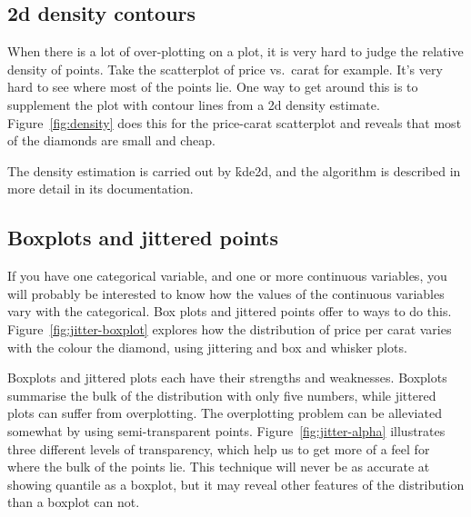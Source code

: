 \subsection{2d density contours}
\label{sub:density2d}

When there is a lot of over-plotting on a plot, it is very hard to judge the relative density of points.  Take the scatterplot of price vs.\ carat for example.  It's very hard to see where most of the points lie.  One way to get around this is to supplement the plot with contour lines from a 2d density estimate.  Figure~\ref{fig:density} does this for the price-carat scatterplot and reveals that most of the diamonds are small and cheap.

% 


The density estimation is carried out by \f{kde2d}, and the algorithm is described in more detail in its documentation.

\subsection{Boxplots and jittered points}
\label{sub:boxplot}

If you have one categorical variable, and one or more continuous variables, you will probably be interested to know how the values of the continuous variables vary with the categorical.  Box plots and jittered points offer to ways to do this.  Figure~\ref{fig:jitter-boxplot} explores how the distribution of price per carat varies with the colour the diamond, using jittering and box and whisker plots.

% 


Boxplots and jittered plots each have their strengths and weaknesses.  Boxplots summarise the bulk of the distribution with only five numbers, while jittered plots can suffer from overplotting.  The overplotting problem can be alleviated somewhat by using semi-transparent points.  Figure~\ref{fig:jitter-alpha} illustrates three different levels of transparency, which help us to get more of a feel for where the bulk of the points lie.  This technique will never be as accurate at showing quantile as a boxplot, but it may reveal other features of the distribution than a boxplot can not.

